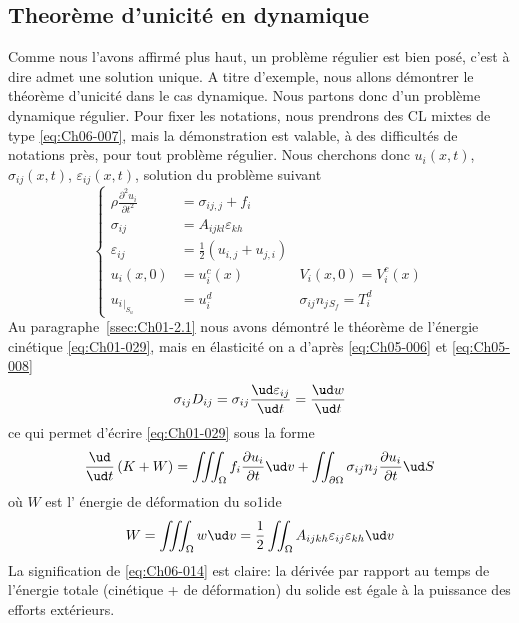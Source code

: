 \subsection{Theorème d'unicité en dynamique} \label{ssec:Ch06-1.2}
Comme nous l'avons affirmé plus haut, un problème régulier est bien 
posé, c'est à dire admet une solution unique.
A titre d'exemple, nous allons démontrer le théorème d'unicité dans le cas dynamique.
Nous partons donc d'un problème dynamique régulier.
Pour fixer les notations, nous prendrons des CL mixtes de type \eqref{eq:Ch06-007}, mais la démonstration est valable, à des difficultés de notations près, pour tout problème régulier.
Nous cherchons donc $u_i\left( x,t \right)$, $\sigma_{ij}\left( x,t \right)$, $\varepsilon_{ij}\left( x,t \right)$, solution du problème suivant
\begin{equation}
    \left\{
    \begin{aligned}
        \rho \frac{\partial^2 u_i}{\partial t^2} &= \sigma_{ij,j} + f_i \\
        \sigma_{ij} &= A_{ijkl} \varepsilon_{kh} \\
        \varepsilon_{ij} &= \frac{1}{2} \left( u_{i,j} + u_{j,i} \right) \\
        u_i \left( x,0 \right) &= u_i^c \left( x \right) \quad & V_i\left( x,0 \right) = V_i^c\left( x \right) \\
        u_i{}_{|_{S_u}} &= u_i^d  \quad & \sigma_{ij} n_j{}_{S_f} = T_i^d
    \end{aligned}
    \right.
    \label{eq:Ch06-012}
\end{equation}
Au paragraphe~\ref{ssec:Ch01-2.1} nous avons démontré le théorème de l'énergie cinétique \eqref{eq:Ch01-029}, mais en élasticité on a d'après \eqref{eq:Ch05-006} et \eqref{eq:Ch05-008}
\begin{equation}
    \sigma_{ij} D_{ij} = \sigma_{ij} \frac{\ud \varepsilon_{ij}}{\ud t} = \frac{\ud w}{\ud t}
    \label{eq:Ch06-013}
\end{equation}
ce qui permet d'écrire \eqref{eq:Ch01-029} sous la forme
\begin{equation}
    \frac{\ud}{\ud t} \left( K + W \right) = \iiint_{\Omega} f_i \frac{\partial u_i}{\partial t} \ud v + \iint_{\partial \Omega} \sigma_{ij} n_j \frac{\partial u_i}{\partial t} \ud S
    \label{eq:Ch06-014}
\end{equation}
où $W$ est l' énergie de déformation du so1ide
\begin{equation}
    W = \iiint_{\Omega} w \ud v = \frac{1}{2} \iint_{\Omega} A_{ijkh} \varepsilon_{ij} \varepsilon_{kh} \ud v
    \label{eq:Ch06-015}
\end{equation}
La signification de \eqref{eq:Ch06-014} est claire: la dérivée par rapport au temps de l'énergie totale (cinétique + de déformation) du solide est égale à la puissance des efforts extérieurs.

